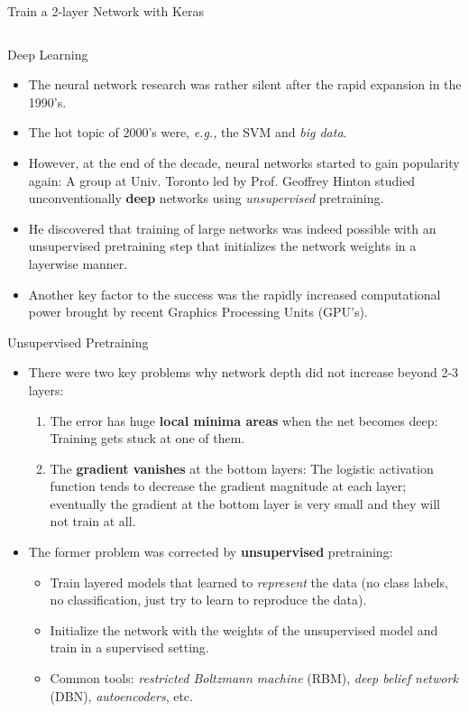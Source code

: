 \documentclass[10pt, aspectratio=169]{beamer} %
\begin{document}
\begin{frame}[fragile]{Train a 2-layer Network with Keras}
\begin{columns}
\end{columns}
\end{frame}

\begin{frame}{Deep Learning}
	\begin{itemize}
		\item The neural network research was rather silent after the rapid expansion in the 1990's.
		\item The hot topic of 2000's were, \emph{e.g.,} the SVM and \emph{big data}.
		\item However, at the end of the decade, neural networks started to gain popularity again:
		A group at Univ. Toronto led by Prof. Geoffrey Hinton studied unconventionally \textbf{deep} networks
		using \emph{unsupervised} pretraining.
		\item He discovered that training of large networks was indeed possible with 
		an unsupervised pretraining step that initializes the network weights in a layerwise manner.
		\item Another key factor to the success was the rapidly increased computational power brought 
		by recent Graphics Processing Units (GPU's).
		\end{itemize}
\end{frame}

\begin{frame}{Unsupervised Pretraining}
	\begin{itemize}
		\item There were two key problems why network depth did not increase beyond 2-3 layers:
		\begin{enumerate}
			\item The error has huge \textbf{local minima areas} when the net becomes deep: Training gets stuck at one of them.
			\item The \textbf{gradient vanishes} at the bottom layers: The logistic activation function tends to decrease the gradient magnitude at each layer;
			eventually the gradient at the bottom layer is very small and they will not train at all.
		\end{enumerate}
		\item The former problem was corrected by \textbf{unsupervised} pretraining:
		\begin{itemize}
			\item Train
		layered models that learned to \emph{represent} the data (no class labels, no classification, just
		try to learn to reproduce the data).
		\item Initialize the network with the weights of the unsupervised model and train in a supervised setting.
		\item Common tools: \emph{restricted Boltzmann machine} (RBM), \emph{deep belief network} (DBN), 
		\emph{autoencoders}, etc.
		\end{itemize}
		\end{itemize}
\end{frame}
\end{document}
